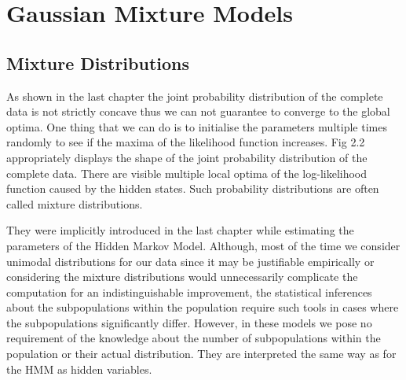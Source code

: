 \chapter{Gaussian Mixture Models}

\ifpdf
    \graphicspath{{Chapter3/Figs/Raster/}{Chapter3/Figs/PDF/}{Chapter3/Figs/}}
\else
    \graphicspath{{Chapter3/Figs/Vector/}{Chapter3/Figs/}}
\fi

\section{Mixture Distributions}

As shown in the last chapter the joint probability distribution of the complete data is not strictly concave thus we can not guarantee to converge to the global optima. One thing that we can do is to initialise the parameters multiple times randomly to see if the maxima of the likelihood function increases. Fig 2.2 appropriately displays the shape of the joint probability distribution of the complete data. There are visible multiple local optima of the log-likelihood function caused by the hidden states. Such probability distributions are often called mixture distributions. 

They were implicitly introduced in the last chapter while estimating the parameters of the Hidden Markov Model. Although, most of the time we consider unimodal distributions for our data since it may be justifiable empirically or considering the mixture distributions would unnecessarily complicate the computation for an indistinguishable improvement, the statistical inferences about the subpopulations within the population require such tools in cases where the subpopulations significantly differ. However, in these models we pose no requirement of the knowledge about the number of subpopulations within the population or their actual distribution. They are interpreted the same way as for the HMM as hidden variables.




